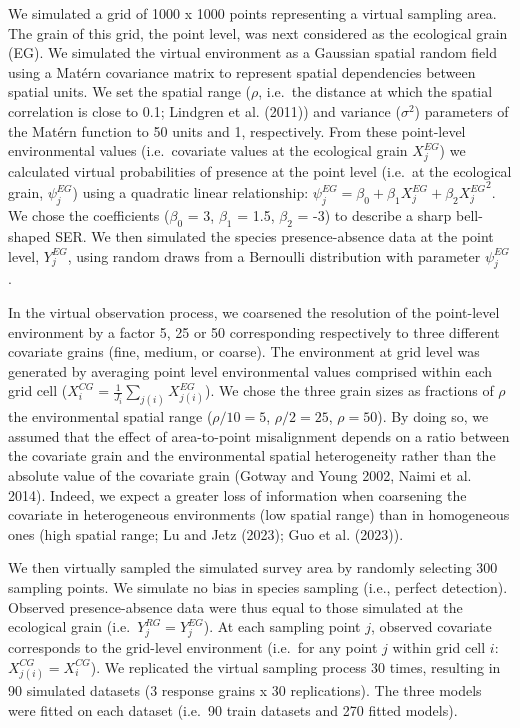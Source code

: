 \documentclass[
  12pt,
  a4paper]{article}
\begin{document}
We simulated a grid of 1000 x 1000 points representing a virtual sampling area. The grain of this grid, the point level, was next considered as the ecological grain (EG). We simulated the virtual environment as a Gaussian spatial random field using a Matérn covariance matrix to represent spatial dependencies between spatial units. We set the spatial range (\(\rho\), i.e.~the distance at which the spatial correlation is close to 0.1; Lindgren et al. (2011)) and variance (\(\sigma^2\)) parameters of the Matérn function to 50 units and 1, respectively. From these point-level environmental values (i.e.~covariate values at the ecological grain \(X^{EG}_j\)) we calculated virtual probabilities of presence at the point level (i.e.~at the ecological grain, \(\psi^{EG}_j\)) using a quadratic linear relationship: \(\psi^{EG}_j = \beta_0 + \beta_1 X^{EG}_j + \beta_2 {X^{EG}_j}^2\). We chose the coefficients (\(\beta_0\) = 3, \(\beta_1\) = 1.5, \(\beta_2\) = -3) to describe a sharp bell-shaped SER. We then simulated the species presence-absence data at the point level, \(Y^{EG}_j\), using random draws from a Bernoulli distribution with parameter \(\psi^{EG}_j\).

In the virtual observation process, we coarsened the resolution of the point-level environment by a factor 5, 25 or 50 corresponding respectively to three different covariate grains (fine, medium, or coarse). The environment at grid level was generated by averaging point level environmental values comprised within each grid cell (\(X^{CG}_i = \frac{1}{J_i}\sum_{j(i)}X^{EG}_{j(i)}\)). We chose the three grain sizes as fractions of \(\rho\) the environmental spatial range (\(\rho/10 = 5\), \(\rho/2 = 25\), \(\rho = 50\)). By doing so, we assumed that the effect of area-to-point misalignment depends on a ratio between the covariate grain and the environmental spatial heterogeneity rather than the absolute value of the covariate grain (Gotway and Young 2002, Naimi et al. 2014). Indeed, we expect a greater loss of information when coarsening the covariate in heterogeneous environments (low spatial range) than in homogeneous ones (high spatial range; Lu and Jetz (2023); Guo et al. (2023)).

We then virtually sampled the simulated survey area by randomly selecting 300 sampling points. We simulate no bias in species sampling (i.e., perfect detection). Observed presence-absence data were thus equal to those simulated at the ecological grain (i.e.~\(Y_{j}^{RG} = Y_j^{EG}\)). At each sampling point \(j\), observed covariate corresponds to the grid-level environment (i.e.~for any point \(j\) within grid cell \(i\): \(X_{j(i)}^{CG} = X_i^{CG}\)). We replicated the virtual sampling process 30 times, resulting in 90 simulated datasets (3 response grains x 30 replications). The three models were fitted on each dataset (i.e.~90 train datasets and 270 fitted models).
\end{document}
